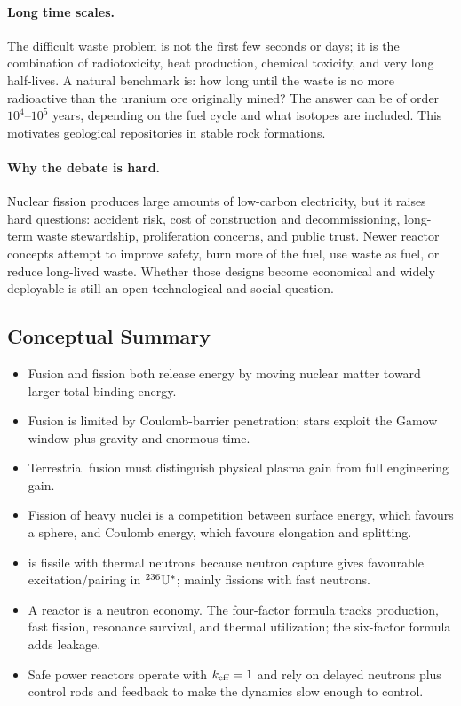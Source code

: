 \paragraph{Long time scales.}
The difficult waste problem is not the first few seconds or days; it is the
combination of radiotoxicity, heat production, chemical toxicity, and very long
half-lives. A natural benchmark is: how long until the waste is no more
radioactive than the uranium ore originally mined? The answer can be of order
$10^4$--$10^5$ years, depending on the fuel cycle and what isotopes are included.
This motivates geological repositories in stable rock formations.

\paragraph{Why the debate is hard.}
Nuclear fission produces large amounts of low-carbon electricity, but it raises
hard questions: accident risk, cost of construction and decommissioning,
long-term waste stewardship, proliferation concerns, and public trust. Newer
reactor concepts attempt to improve safety, burn more of the fuel, use waste as
fuel, or reduce long-lived waste. Whether those designs become economical and
widely deployable is still an open technological and social question.

\subsection*{Conceptual Summary}

\begin{itemize}
  \item Fusion and fission both release energy by moving nuclear matter toward
        larger total binding energy.
  \item Fusion is limited by Coulomb-barrier penetration; stars exploit the
        Gamow window plus gravity and enormous time.
  \item Terrestrial fusion must distinguish physical plasma gain from full
        engineering gain.
  \item Fission of heavy nuclei is a competition between surface energy, which
        favours a sphere, and Coulomb energy, which favours elongation and
        splitting.
  \item {} is fissile with thermal neutrons because neutron capture
        gives favourable excitation/pairing in $\nucleus{U}{236}^{\ast}$;
         mainly fissions with fast neutrons.
  \item A reactor is a neutron economy. The four-factor formula tracks
        production, fast fission, resonance survival, and thermal utilization;
        the six-factor formula adds leakage.
  \item Safe power reactors operate with $k_{\rm eff}=1$ and rely on delayed
        neutrons plus control rods and feedback to make the dynamics slow enough
        to control.
\end{itemize}
